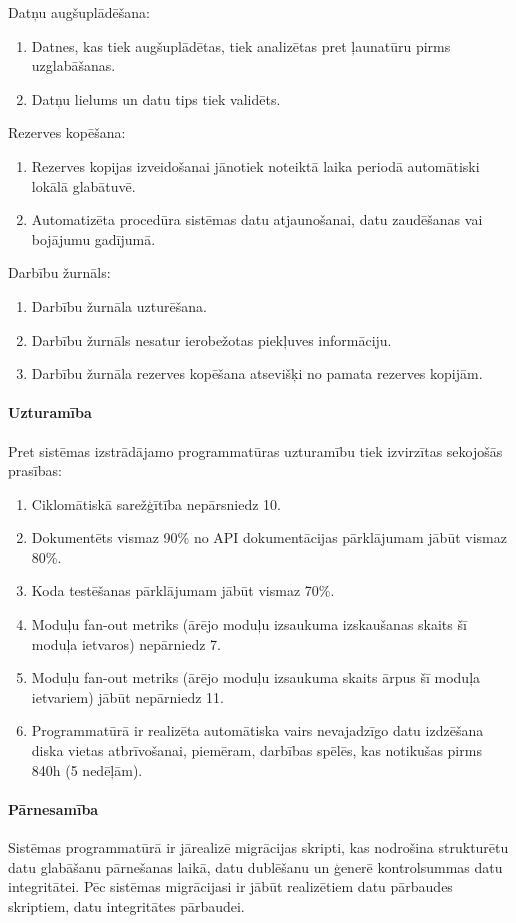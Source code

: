 	\item Datņu augšuplādēšana:
		\begin{enumerate}
\item Datnes, kas tiek augšuplādētas, tiek analizētas pret ļaunatūru pirms uzglabāšanas.
\item Datņu lielums un datu tips tiek validēts.
		\end{enumerate}
	\item Rezerves kopēšana:
		\begin{enumerate}
\item Rezerves kopijas izveidošanai jānotiek noteiktā laika periodā automātiski lokālā glabātuvē.
\item Automatizēta procedūra sistēmas datu atjaunošanai, datu zaudēšanas vai bojājumu gadījumā.
		\end{enumerate}
	\item Darbību žurnāls:
		\begin{enumerate}
\item Darbību žurnāla uzturēšana.
\item Darbību žurnāls nesatur ierobežotas piekļuves informāciju.
\item Darbību žurnāla rezerves kopēšana atsevišķi no pamata rezerves kopijām. 
		\end{enumerate}

    \paragraph{Uzturamība}

    Pret sistēmas izstrādājamo programmatūras uzturamību tiek izvirzītas sekojošās prasības:

    \begin{enumerate}
        \item Ciklomātiskā sarežģītība nepārsniedz 10.
        \item Dokumentēts vismaz 90\% no API dokumentācijas pārklājumam jābūt vismaz 80\%.
        \item Koda testēšanas pārklājumam jābūt vismaz 70\%.
        \item Moduļu fan-out metriks (ārējo moduļu izsaukuma izskaušanas skaits šī moduļa ietvaros) nepārniedz 7.
        \item Moduļu fan-out metriks (ārējo moduļu izsaukuma skaits ārpus šī moduļa ietvariem) jābūt nepārniedz 11.
        \item Programmatūrā ir realizēta automātiska vairs nevajadzīgo datu izdzēšana diska vietas atbrīvošanai, piemēram, darbības spēlēs, kas notikušas pirms 840h (5 nedēļām).
    \end{enumerate}

\paragraph{Pārnesamība}

Sistēmas programmatūrā ir jārealizē migrācijas skripti, kas nodrošina
strukturētu datu glabāšanu pārnešanas laikā, datu dublēšanu un ģenerē
kontrolsummas datu integritātei. Pēc sistēmas migrācijasi ir jābūt realizētiem
datu pārbaudes skriptiem, datu integritātes pārbaudei.

